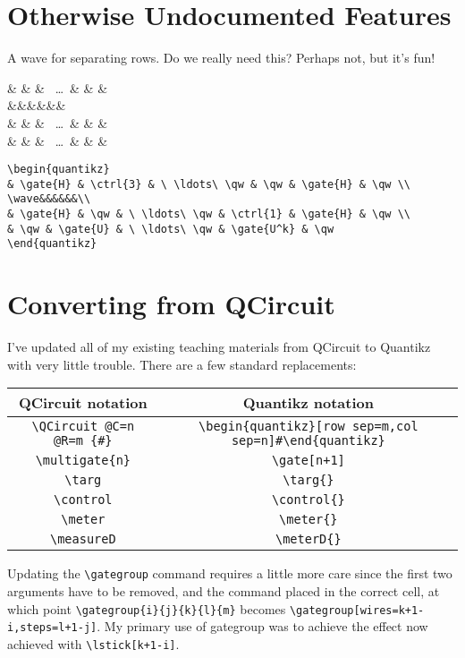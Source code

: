 \documentclass[aps,pra,10pt,nofootinbib]{revtex4}
\begin{document}
\section{Otherwise Undocumented Features}
A wave for separating rows. Do we really need this? Perhaps not, but it's fun!
\begin{Code}
\begin{center}
\begin{quantikz}
&  &  & \ \ldots\ \qw & \qw &  & \qw \\
\wave&&&&&&\\
&  & \qw & \ \ldots\ \qw &  &  & \qw \\
& \qw &  & \ \ldots\ \qw &  & \qw & \qw
\end{quantikz}
\end{center}
\tcblower
\begin{lstlisting}
\begin{quantikz}
& \gate{H} & \ctrl{3} & \ \ldots\ \qw & \qw & \gate{H} & \qw \\
\wave&&&&&&\\
& \gate{H} & \qw & \ \ldots\ \qw & \ctrl{1} & \gate{H} & \qw \\
& \qw & \gate{U} & \ \ldots\ \qw & \gate{U^k} & \qw
\end{quantikz}
\end{lstlisting}
\end{Code}

\section{Converting from QCircuit}

I've updated all of my existing teaching materials from QCircuit to Quantikz with very little trouble. There are a few standard replacements:
\begin{center}
\begin{tabular}{c|c}
QCircuit notation & Quantikz notation \\
\hline
\verb!\QCircuit @C=n @R=m {#}! & \verb!\begin{quantikz}[row sep=m,col sep=n]#\end{quantikz}!	\\
\verb!\multigate{n}! & \verb!\gate[n+1]!	\\
\verb!\targ! & \verb!\targ{}! \\
\verb!\control! & \verb!\control{}! \\
\verb!\meter! & \verb!\meter{}! \\
\verb!\measureD! & \verb!\meterD{}! \\
\end{tabular}
\end{center}
Updating the \verb!\gategroup! command requires a little more care since the first two arguments have to be removed, and the command placed in the correct cell, at which point \verb!\gategroup{i}{j}{k}{l}{m}! becomes \verb!\gategroup[wires=k+1-i,steps=l+1-j]!. My primary use of gategroup was to achieve the effect now achieved with \verb!\lstick[k+1-i]!.
\end{document}
